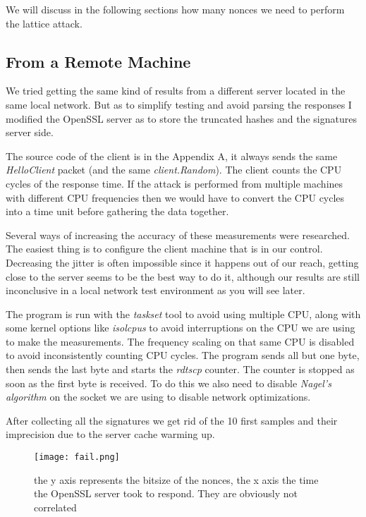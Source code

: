 \documentclass[a4paper,11pt]{article}
\begin{document}
We will discuss in the following sections how many nonces we need to perform the lattice attack.


\subsection{From a Remote Machine}

We tried getting the same kind of results from a different server located in the same local network. But as to simplify testing and avoid parsing the responses I modified the OpenSSL server as to store the truncated hashes and the signatures server side.

The source code of the client is in the Appendix A, it always sends the same \textit{HelloClient} packet (and the same \textit{client.Random}). The client counts the CPU cycles of the response time. If the attack is performed from multiple machines with different CPU frequencies then we would have to convert the CPU cycles into a time unit before gathering the data together.

Several ways of increasing the accuracy of these measurements were researched. The easiest thing is to configure the client machine that is in our control. Decreasing the jitter is often impossible since it happens out of our reach, getting close to the server seems to be the best way to do it, although our results are still inconclusive in a local network test environment as you will see later.

The program is run with the \textit{taskset} tool to avoid using multiple CPU, along with some kernel options like \textit{isolcpus} to avoid interruptions on the CPU we are using to make the measurements. The frequency scaling on that same CPU is disabled to avoid inconsistently counting CPU cycles. The program sends all but one byte, then sends the last byte and starts the \textit{rdtscp} counter. The counter is stopped as soon as the first byte is received. To do this we also need to disable \textit{Nagel's algorithm} on the socket we are using to disable network optimizations.

After collecting all the signatures we get rid of the 10 first samples and their imprecision due to the server cache warming up.

\begin{figure}[H]
\texttt{[image: fail.png]}
\caption{the y axis represents the bitsize of the nonces, the x axis the time the OpenSSL server took to respond. They are obviously not correlated}
\end{figure}
\end{document}
